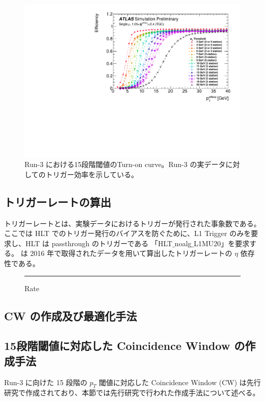 \begin{figure}[tb]
  \centering
  \includegraphics[clip, width=15cm]{fig/3/PLOT-TRIG-2020-01-fig1.pdf}
  \caption{Run-3 における15段階閾値のTurn-on curve。Run-3 の実データに対してのトリガー効率を示している。}
  \label{fig:Run3_15_Data}
\end{figure}

\subsection{トリガーレートの算出}
トリガーレートとは、実験データにおけるトリガーが発行された事象数である。ここでは HLT でのトリガー発行のバイアスを防ぐために、L1 Trigger のみを要求し、HLT は passthrough のトリガーである 「HLT$\_$noalg$\_$L1MU20」を要求する。 は 2016 年で取得されたデータを用いて算出したトリガーレートの $\eta$ 依存性である。

\begin{figure}[tb]
  \centering
  \rule{8cm}{6cm}
  \caption{Rate}
  \label{fig:Run3_rate}
\end{figure}



\subsection{CW の作成及び最適化手法}\label{section:最適化}
\subsection{15段階閾値に対応した Coincidence Window の作成手法}
Run-3 に向けた 15 段階の $p_T$ 閾値に対応した Coincidence Window (CW) は先行研究で作成されており、本節では先行研究で行われた作成手法について述べる。

